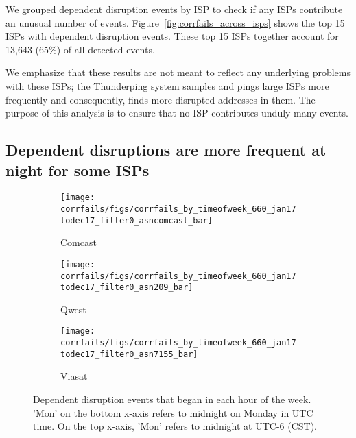 We grouped dependent disruption events by ISP to check if any ISPs contribute an
unusual number of events. Figure~\ref{fig:corrfails_across_isps} shows the top 15
ISPs with dependent disruption events.
These top 15 ISPs together account
for 13,643 (65\%) of all detected events.

We emphasize that these results are not meant to reflect any
underlying problems with these ISPs; the Thunderping system samples
and pings large ISPs more frequently and consequently, finds more
disrupted addresses in them. The purpose of this analysis is to ensure
that no ISP contributes unduly many events.

\subsection{Dependent disruptions are more frequent at night for some
ISPs}

\begin{figure*}[t]
\begin{subfigure}[t]{0.32\linewidth}
\centering
\texttt{[image: corrfails/figs/corrfails\_by\_timeofweek\_660\_jan17todec17\_filter0\_asncomcast\_bar]}
\caption{
Comcast
\label{fig:corrfails_timeofweek_comcast}
}
\end{subfigure}
%
\hfill
%
\begin{subfigure}[t]{0.32\linewidth}
\centering
\texttt{[image: corrfails/figs/corrfails\_by\_timeofweek\_660\_jan17todec17\_filter0\_asn209\_bar]}
\caption{
Qwest
\label{fig:corrfails_timeofweek_qwest}
}
\end{subfigure}
%
\hfill
%
\begin{subfigure}[t]{0.32\linewidth}
\centering
\texttt{[image: corrfails/figs/corrfails\_by\_timeofweek\_660\_jan17todec17\_filter0\_asn7155\_bar]}
\caption{
Viasat
\label{fig:corrfails_timeofweek_viasat}
}
\end{subfigure}
\caption{
\label{fig:corrfails_tow_asn}
Dependent disruption events that began in each hour of the week. 'Mon' on the
bottom x-axis refers to midnight on Monday in UTC time. On the top x-axis, 'Mon' refers to midnight at UTC-6 (CST). 
}
\end{figure*}

 
